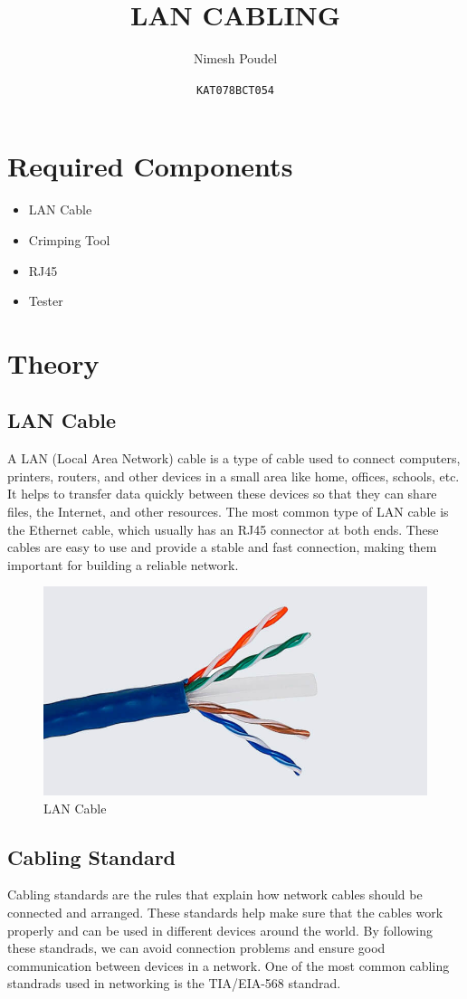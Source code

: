 \documentclass[a4paper]{article}
\title{LAN CABLING}
\author{Nimesh Poudel}
\date{\texttt{KAT078BCT054}}
\begin{document}
\maketitle
\section{Required Components}
\begin{itemize}
    \item LAN Cable
    \item Crimping Tool
    \item RJ45
    \item Tester
\end{itemize}

\section{Theory}
\subsection{LAN Cable}
A LAN (Local Area Network) cable is a type of cable used to connect computers, printers, routers, and other devices in a small area like home, offices, schools, etc. It helps to transfer data quickly between these devices so that they can share files, the Internet, and other resources. The most common type of LAN cable is the Ethernet cable, which usually has an RJ45 connector at both ends. These cables are easy to use and provide a stable and fast connection, making them important for building a reliable network.\\
\begin{figure}[h]
    \centering
    \includegraphics[width=0.9\linewidth]{lan-cable.jpg}
    \caption{LAN Cable}
    \label{fig:lan_cable}
\end{figure}

\subsection{Cabling Standard}
Cabling standards are the rules that explain how network cables should be connected and arranged. These standards help make sure that the cables work properly and can be used in different devices around the world. By following these standrads, we can avoid connection problems and ensure good communication between devices in a network. One of the most common cabling standrads used in networking is the TIA/EIA-568 standrad.
\end{document}
